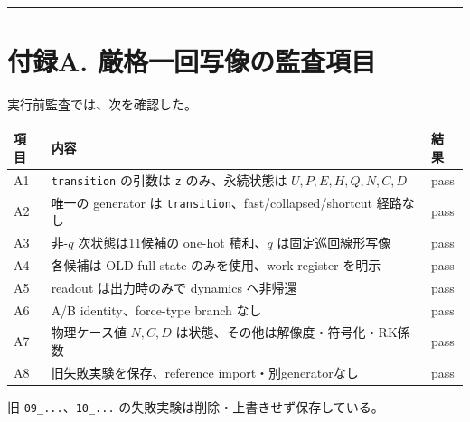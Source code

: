 \documentclass[
  a4paper,
]{ltjsarticle}
\newcounter{none} %
\begin{document}
\begin{center}\rule{0.5\linewidth}{0.5pt}\end{center}

\section{付録A.
厳格一回写像の監査項目}\label{ux4ed8ux9332a.-ux53b3ux683cux4e00ux56deux5199ux50cfux306eux76e3ux67fbux9805ux76ee}

実行前監査では、次を確認した。

{\def\LTcaptype{none} %
\begin{longtable}[]{@{}
  >{\raggedright\arraybackslash}p{}
  >{\raggedright\arraybackslash}p{}
  >{\raggedright\arraybackslash}p{}@{}}
\toprule\noalign{}
\begin{minipage}[b]{\linewidth}\raggedright
項目
\end{minipage} & \begin{minipage}[b]{\linewidth}\raggedright
内容
\end{minipage} & \begin{minipage}[b]{\linewidth}\raggedright
結果
\end{minipage} \\
\midrule\noalign{}
\endhead
\bottomrule\noalign{}
\endlastfoot
A1 & \texttt{transition} の引数は \texttt{z} のみ、永続状態は
\(U,P,E,H,Q,N,C,D\) & pass \\
A2 & 唯一の generator は \texttt{transition}、fast/collapsed/shortcut
経路なし & pass \\
A3 & 非-\(q\) 次状態は11候補の one-hot 積和、\(q\) は固定巡回線形写像 &
pass \\
A4 & 各候補は OLD full state のみを使用、work register を明示 & pass \\
A5 & readout は出力時のみで dynamics へ非帰還 & pass \\
A6 & A/B identity、force-type branch なし & pass \\
A7 & 物理ケース値 \(N,C,D\) は状態、その他は解像度・符号化・RK係数 &
pass \\
A8 & 旧失敗実験を保存、reference import・別generatorなし & pass \\
\end{longtable}
}

旧 \texttt{09\_...}、\texttt{10\_...}
の失敗実験は削除・上書きせず保存している。
\end{document}
